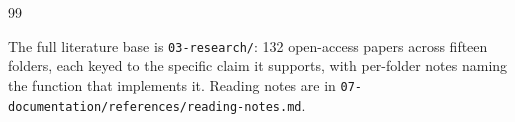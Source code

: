 \documentclass[conference,a4paper]{IEEEtran}
\begin{document}
\begin{thebibliography}{99}
\end{thebibliography}

\vspace{4mm}
\noindent\small The full literature base is \texttt{03-research/}: 132
open-access papers across fifteen folders, each keyed to the specific claim it
supports, with per-folder notes naming the function that implements it.
Reading notes are in \texttt{07-documentation/references/reading-notes.md}.
\end{document}
